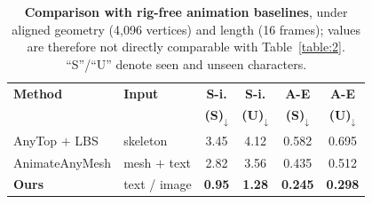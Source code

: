 \documentclass[lettersize,journal]{IEEEtran}
\newcommand{\blu}[1]{\texorpdfstring{{\leavevmode\color{blue}#1}}{#1}}
\begin{document}
\begin{table}[t]
  \centering
  \setlength{\abovecaptionskip}{0.5mm}
  \renewcommand{\arraystretch}{1.3}
  \scriptsize
  \caption{\blu{\textbf{Comparison with rig-free animation baselines}, under aligned
  geometry (4,096 vertices) and length (16 frames); values are therefore not directly
  comparable with Table~\ref{table:2}. ``S''/``U'' denote seen and unseen characters.}}
  \label{table:rigfree}
  \begin{tabularx}{\linewidth}{lXcccc}
    \toprule[1.5pt]
    \blu{\textbf{Method}} & \blu{\textbf{Input}} & \blu{\textbf{S-i.}} & \blu{\textbf{S-i.}} & \blu{\textbf{A-E}} & \blu{\textbf{A-E}} \\
                    &                & \blu{\textbf{(S)}$_{\downarrow}$} & \blu{\textbf{(U)}$_{\downarrow}$}
                    & \blu{\textbf{(S)}$_{\downarrow}$} & \blu{\textbf{(U)}$_{\downarrow}$} \\
    \midrule[0.5pt]
    \blu{AnyTop $+$ LBS}  & \blu{skeleton}     & \blu{3.45} & \blu{4.12} & \blu{0.582} & \blu{0.695} \\
    \blu{AnimateAnyMesh}  & \blu{mesh $+$ text} & \blu{2.82} & \blu{3.56} & \blu{0.435} & \blu{0.512} \\
    \midrule[0.5pt]
    \blu{\textbf{Ours}}   & \blu{text / image} & \blu{\textbf{0.95}} & \blu{\textbf{1.28}} & \blu{\textbf{0.245}} & \blu{\textbf{0.298}} \\
    \bottomrule[1.5pt]
  \end{tabularx}
\end{table}
\end{document}
